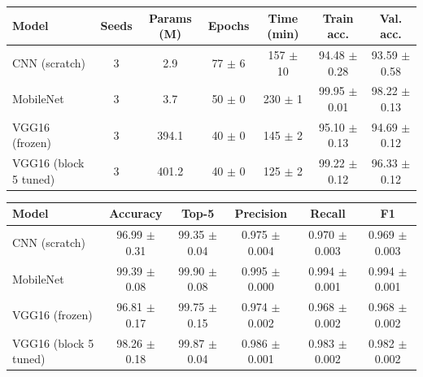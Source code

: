 \begin{tabular}{@{}lcccccc@{}}
\toprule
Model & Seeds & Params (M) & Epochs & Time (min) & Train acc. & Val. acc. \\
\midrule
CNN (scratch) & 3 & 2.9 & 77 $\pm$ 6 & 157 $\pm$ 10 & 94.48 $\pm$ 0.28 & 93.59 $\pm$ 0.58 \\
MobileNet & 3 & 3.7 & 50 $\pm$ 0 & 230 $\pm$ 1 & 99.95 $\pm$ 0.01 & 98.22 $\pm$ 0.13 \\
VGG16 (frozen) & 3 & 394.1 & 40 $\pm$ 0 & 145 $\pm$ 2 & 95.10 $\pm$ 0.13 & 94.69 $\pm$ 0.12 \\
VGG16 (block 5 tuned) & 3 & 401.2 & 40 $\pm$ 0 & 125 $\pm$ 2 & 99.22 $\pm$ 0.12 & 96.33 $\pm$ 0.12 \\
\bottomrule
\end{tabular}


\begin{tabular}{@{}lccccc@{}}
\toprule
Model & Accuracy & Top-5 & Precision & Recall & F1 \\
\midrule
CNN (scratch) & 96.99 $\pm$ 0.31 & 99.35 $\pm$ 0.04 & 0.975 $\pm$ 0.004 & 0.970 $\pm$ 0.003 & 0.969 $\pm$ 0.003 \\
MobileNet & 99.39 $\pm$ 0.08 & 99.90 $\pm$ 0.08 & 0.995 $\pm$ 0.000 & 0.994 $\pm$ 0.001 & 0.994 $\pm$ 0.001 \\
VGG16 (frozen) & 96.81 $\pm$ 0.17 & 99.75 $\pm$ 0.15 & 0.974 $\pm$ 0.002 & 0.968 $\pm$ 0.002 & 0.968 $\pm$ 0.002 \\
VGG16 (block 5 tuned) & 98.26 $\pm$ 0.18 & 99.87 $\pm$ 0.04 & 0.986 $\pm$ 0.001 & 0.983 $\pm$ 0.002 & 0.982 $\pm$ 0.002 \\
\bottomrule
\end{tabular}
